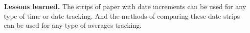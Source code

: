 \documentclass{sig-alternate}
\begin{document}
\textbf{Lessons learned.}
The strips of paper with date increments can be used for any type of time or date tracking. And the methods of comparing these date strips can be used for any type of averages tracking.





\end{document}
